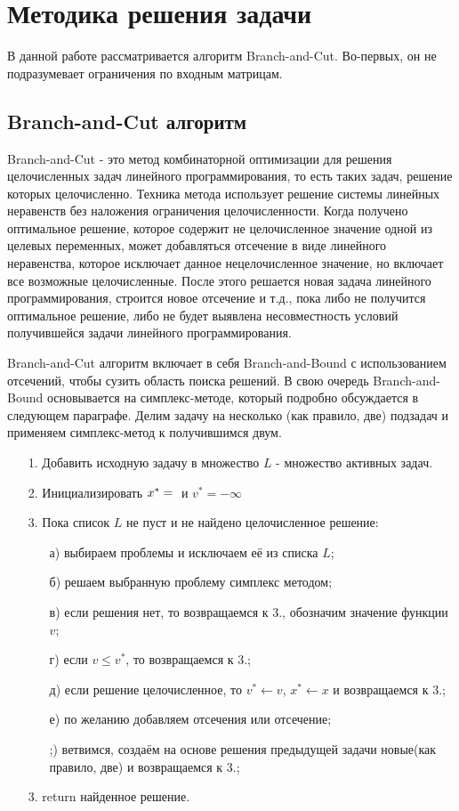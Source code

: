\documentclass[a4paper,14pt,russian]{extreport}
\begin{document}
\chapter{Методика решения задачи}
В данной работе рассматривается алгоритм Branch-and-Cut. Во-первых, он не подразумевает ограничения по входным матрицам. 
\section{Branch-and-Cut алгоритм}
Branch-and-Cut - это метод комбинаторной оптимизации для решения целочисленных задач линейного программирования, то есть таких задач, решение которых целочисленно. Техника метода использует решение системы линейных неравенств без наложения ограничения целочисленности. Когда получено оптимальное решение, которое содержит не целочисленное значение одной из целевых переменных, может добавляться отсечение в виде линейного неравенства, которое исключает данное нецелочисленное значение, но включает все возможные целочисленные. После этого решается новая задача линейного программирования, строится новое отсечение и т.д., пока либо не получится оптимальное решение, либо не будет выявлена несовместность условий получившейся задачи линейного программирования. 
\par
Branch-and-Cut алгоритм включает в себя Branch-and-Bound с использованием отсечений, чтобы сузить область поиска решений. В свою очередь Branch-and-Bound основывается на симплекс-методе, который подробно обсуждается в следующем параграфе. Делим задачу на несколько (как правило, две) подзадач и применяем симплекс-метод к получившимся двум.

\begin{enumerate}
\item[1.]
Добавить исходную задачу в множество $L$ - множество активных задач.
\item[2.]
Инициализировать $x^* = \null$ и $v^* = -\infty$
\item[3.]
Пока список $L$ не пуст и не найдено целочисленное решение:
\begin{enumerate}
\item[а)] выбираем проблемы и исключаем её из списка $L$;
\item[б)] решаем выбранную проблему симплекс методом;
\item[в)] если решения нет, то возвращаемся к 3., обозначим значение функции $v$; 
\item[г)] если  $v \le v^*$, то возвращаемся к 3.;
\item[д)] если решение целочисленное, то $v^* \leftarrow v$, $x^* \leftarrow x$ и возвращаемся к 3.;
\item[е)] по желанию добавляем отсечения или отсечение;
\item[;)] ветвимся, создаём на основе решения предыдущей задачи новые(как правило, две) и возвращаемся к 3.;
\end{enumerate}
\item[3.] return найденное решение.
\end{enumerate}
 
\end{document}
